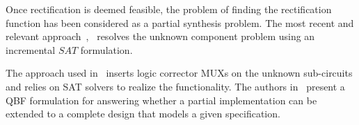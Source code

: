 Once rectification is deemed feasible, the problem of finding the
rectification function has been considered as a partial synthesis
problem. The most recent and relevant
approach~\cite{fujita:2015},~\cite{fujita:2012} resolves the unknown
component problem using an incremental $SAT$ formulation. 

  

The approach used in~\cite{andreas:2005} inserts logic corrector MUXs on the
unknown sub-circuits and relies on SAT solvers to realize the
functionality. The authors in~\cite{scholl:2} present a QBF 
formulation for answering whether a partial implementation can be extended 
to a complete design that models a given specification.

